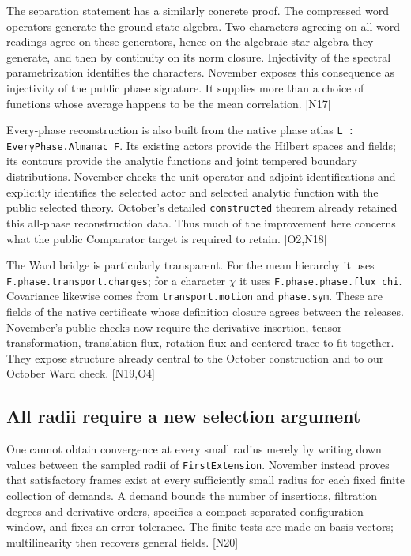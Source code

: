 \documentclass[11pt]{article}
\newcommand{\code}[1]{{\small\nolinkurl{#1}}}
\newcommand{\src}[1]{\textsf{[#1]}}
\begin{document}
The separation statement has a similarly concrete proof. The compressed
word operators generate the ground-state algebra. Two characters agreeing
on all word readings agree on these generators, hence on the algebraic
star algebra they generate, and then by continuity on its norm closure.
Injectivity of the spectral parametrization identifies the characters.
November exposes this consequence as injectivity of the public phase
signature. It supplies more than a choice of functions whose average
happens to be the mean correlation. \src{N17}

Every-phase reconstruction is also built from the native phase atlas
\code{L : EveryPhase.Almanac F}. Its existing actors provide the Hilbert
spaces and fields; its contours provide the analytic functions and joint
tempered boundary distributions. November checks the unit operator and
adjoint identifications and explicitly identifies the selected actor and
selected analytic function with the public selected theory. October's
detailed \code{constructed} theorem already retained this all-phase
reconstruction data. Thus much of the improvement here concerns what the
public Comparator target is required to retain. \src{O2,N18}

The Ward bridge is particularly transparent. For the mean hierarchy it
uses \code{F.phase.transport.charges}; for a character $\chi$ it uses
\code{F.phase.phase.flux chi}. Covariance likewise comes from
\code{transport.motion} and \code{phase.sym}. These are fields of the
native certificate whose definition closure agrees between the releases.
November's public checks now require the derivative insertion, tensor
transformation, translation flux, rotation flux and centered trace to fit
together. They expose structure already central to the October construction
and to our October Ward check. \src{N19,O4}

\subsection{All radii require a new selection argument}

One cannot obtain convergence at every small radius merely by writing down
values between the sampled radii of \code{FirstExtension}. November instead
proves that satisfactory frames exist at every sufficiently small radius
for each fixed finite collection of demands. A demand bounds the number of
insertions, filtration degrees and derivative orders, specifies a compact
separated configuration window, and fixes an error tolerance. The finite
tests are made on basis vectors; multilinearity then recovers general
fields. \src{N20}
\end{document}
